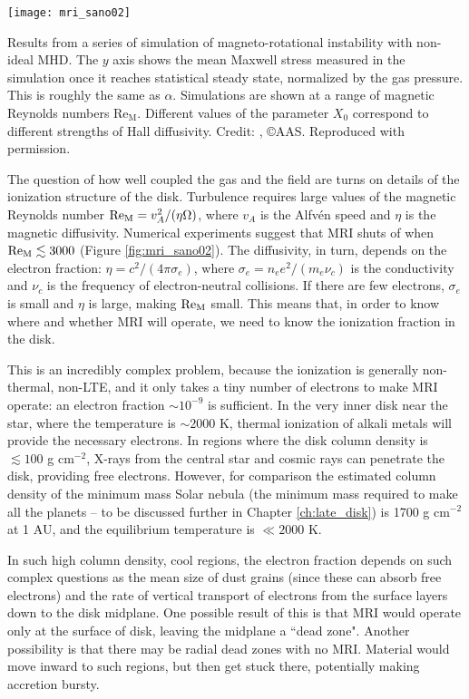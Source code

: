 \begin{marginfigure}
\texttt{[image: mri\_sano02]}
\caption[Maxwell stress in non-ideal MHD simulations of the MRI]{
\label{fig:mri_sano02}
Results from a series of simulation of magneto-rotational instability with non-ideal MHD. The $y$ axis shows the mean Maxwell stress measured in the simulation once it reaches statistical steady state, normalized by the gas pressure. This is roughly the same as $\alpha$. Simulations are shown at a range of magnetic Reynolds numbers $\mbox{Re}_{\mathrm{M}}$. Different values of the parameter $X_0$ correspond to different strengths of Hall diffusivity. Credit: \citet{sano02a}, \copyright AAS. Reproduced with permission.
}
\end{marginfigure}

The question of how well coupled the gas and the field are turns on details of the ionization structure of the disk. Turbulence requires large values of the magnetic Reynolds number $\mbox{Re}_{\rm M} = v_A^2 /(\eta\Omega)$, where $v_A$ is the Alfv\'en speed and $\eta$ is the magnetic diffusivity. Numerical experiments suggest that MRI shuts of when $\mbox{Re}_{\rm M} \lesssim 3000$ (Figure \ref{fig:mri_sano02}). The diffusivity, in turn, depends on the electron fraction: $\eta = c^2/(4\pi \sigma_e)$, where $\sigma_e = n_e e^2/(m_e \nu_c)$ is the conductivity and $\nu_c$ is the frequency of electron-neutral collisions. If there are few electrons, $\sigma_e$ is small and $\eta$ is large, making $\mbox{Re}_{\rm M}$ small. This means that, in order to know where and whether MRI will operate, we need to know the ionization fraction in the disk.

This is an incredibly complex problem, because the ionization is generally non-thermal, non-LTE, and it only takes a tiny number of electrons to make MRI operate: an electron fraction $\sim 10^{-9}$ is sufficient. In the very inner disk near the star, where the temperature is $\sim 2000$ K, thermal ionization of alkali metals will provide the necessary electrons. In regions where the disk column density is $\lesssim 100$ g cm$^{-2}$, X-rays from the central star and cosmic rays can penetrate the disk, providing free electrons. However, for comparison the estimated column density of the minimum mass Solar nebula (the minimum mass required to make all the planets -- to be discussed further in Chapter \ref{ch:late_disk}) is 1700 g cm$^{-2}$ at 1 AU, and the equilibrium temperature is $\ll 2000$ K.

In such high column density, cool regions, the electron fraction depends on such complex questions as the mean size of dust grains (since these can absorb free electrons) and the rate of vertical transport of electrons from the surface layers down to the disk midplane. One possible result of this is that MRI would operate only at the surface of disk, leaving the midplane a ``dead zone". Another possibility is that there may be radial dead zones with no MRI. Material would move inward to such regions, but then get stuck there, potentially making accretion bursty.


